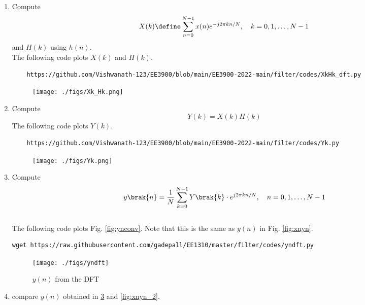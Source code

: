 \documentclass[journal,12pt,twocolumn]{IEEEtran}
\renewcommand\thesection{\arabic{section}}
\begin{document}
\begin{enumerate}[label=\thesection.\arabic*]
\item
Compute
\begin{equation}
X(k) \define \sum _{n=0}^{N-1}x(n) e^{-j2\pi kn/N}, \quad k = 0,1,\dots, N-1
\end{equation}
and $H(k)$ using $h(n)$.\\
\solution The following code plots $X(k)$ and $H(k)$.
\begin{lstlisting}
    https://github.com/Vishwanath-123/EE3900/blob/main/EE3900-2022-main/filter/codes/XkHk_dft.py
\end{lstlisting}

\begin{figure}[!ht]
\centering
\texttt{[image: ./figs/Xk\_Hk.png]}
\caption{}
\label{fig:Hk_Xk}
\end{figure}

\item Compute 
\begin{equation}
Y(k) = X(k)H(k)
\end{equation}
\solution The following code plots $Y(k)$.
\begin{lstlisting}
    https://github.com/Vishwanath-123/EE3900/blob/main/EE3900-2022-main/filter/codes/Yk.py
\end{lstlisting}

\begin{figure}[!ht]
\centering
\texttt{[image: ./figs/Yk.png]}
\caption{}
\label{fig:Yk}
\end{figure}

\item Compute
\begin{equation}
 y\brak{n}={\frac {1}{N}}\sum _{k=0}^{N-1}Y\brak{k}\cdot e^{j 2\pi kn/N},\quad n = 0,1,\dots, N-1
\end{equation}
\\
\solution The following code plots Fig. \ref{fig:ynconv}. Note that this is the same as 
$y(n)$ in  Fig. 
\ref{fig:xnyn}. 
%
\begin{lstlisting}
wget https://raw.githubusercontent.com/gadepall/EE1310/master/filter/codes/yndft.py
\end{lstlisting}
\begin{figure}[!ht]
\centering
\texttt{[image: ./figs/yndft]}
\caption{$y(n)$ from the DFT}
\label{fig:yndft}
\end{figure}

\item compare $y(n)$ obtained in \ref{fig:yndft} and \ref{fig:xnyn_2}.\\
\solution 




\end{enumerate}
\end{document}
